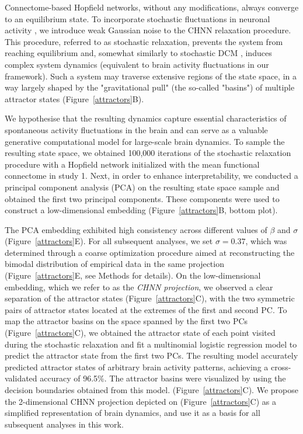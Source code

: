 \documentclass{article}
\begin{document}
Connectome-based Hopfield networks, without any modifications, always converge to an equilibrium state.
To incorporate stochastic fluctuations in neuronal activity \citep{robinson2005multiscale}, we introduce weak
Gaussian noise to the CHNN relaxation procedure. This procedure, referred to as stochastic relaxation, prevents the
system from reaching equilibrium and, somewhat similarly to stochastic DCM \citep{daunizeau2012stochastic}, induces
complex system dynamics  (equivalent to brain activity fluctuations in our framework). Such a system may traverse extensive
regions of the state space, in a way largely shaped by the "gravitational pull" (the so-called "basins") of multiple attractor states (Figure~\ref{attractors}B).

We hypothesise that the resulting dynamics capture essential characteristics of spontaneous activity fluctuations in
the brain and can serve as a valuable generative computational model for large-scale brain dynamics. To sample the
resulting state space, we obtained 100,000 iterations of the stochastic relaxation procedure with a Hopfield network
initialized with the mean functional connectome in study 1. Next, in order to enhance interpretability, we conducted a
principal component analysis (PCA) on the resulting state space sample and obtained the first two principal components.
These components were used to construct a low-dimensional embedding (Figure~\ref{attractors}B, bottom plot).

The PCA embedding exhibited high consistency across different values of $\beta$ and $\sigma$ (Figure~\ref{attractors}E).
For all subsequent analyses, we set $\sigma=0.37$, which was determined through a coarse optimization procedure aimed
at reconstructing the bimodal distribution of empirical data in the same projection (Figure~\ref{attractors}E,
see Methods for details). On the low-dimensional embedding, which we refer to as the \textit{CHNN projection}, we observed
a clear separation of the attractor states (Figure~\ref{attractors}C), with the two symmetric pairs of attractor states
located at the extremes of the first and second PC.
To map the attractor basins on the space spanned by the first two PCs (Figure~\ref{attractors}C), we obtained the attractor state of each point visited during the stochastic relaxation and fit a multinomial logistic regression model to predict the attractor state from the first two PCs.
The resulting model accurately predicted attractor states of arbitrary brain activity patterns, achieving a cross-validated accuracy of 96.5\%.
The attractor basins were visualized by using the decision boundaries obtained from this model. (Figure~\ref{attractors}C). We propose the 2-dimensional CHNN projection depicted on (Figure~\ref{attractors}C) as a simplified representation of brain dynamics, and use it as a basis for all subsequent analyses in this work.
\end{document}
